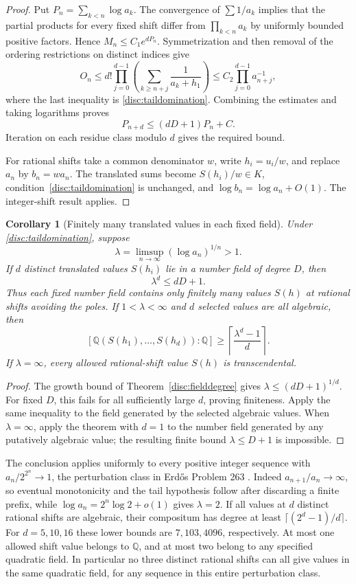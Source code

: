 \documentclass[11pt,a4paper]{article}
\newtheorem{corollary}[theorem]{Corollary}
\theoremstyle{definition}
\theoremstyle{remark}
\numberwithin{equation}{section}
\begin{document}
\begin{proof}
Put $P_n=\sum_{k<n}\log a_k$.  The convergence of $\sum1/a_k$
implies that the partial products for every fixed shift differ from
$\prod_{k<n}a_k$ by uniformly bounded positive factors.  Hence
$M_n\le C_1e^{dP_n}$.  Symmetrization and then removal of the
ordering restrictions on distinct indices give
\[
 O_n\le d!\prod_{j=0}^{d-1}
             \left(\sum_{k\ge n+j}\frac1{a_k+h_1}\right)
       \le C_2\prod_{j=0}^{d-1}a_{n+j}^{-1},
\]
where the last inequality is \eqref{disc:taildomination}.
Combining the estimates and taking logarithms proves
\[
 P_{n+d}\le(dD+1)P_n+C.
\]
Iteration on each residue class modulo $d$ gives the required bound.

For rational shifts take a common denominator $w$, write $h_i=u_i/w$,
and replace $a_n$ by $b_n=wa_n$.  The translated sums become
$S(h_i)/w\in K$, condition~\eqref{disc:taildomination} is unchanged,
and $\log b_n=\log a_n+O(1)$.  The integer-shift result applies.
\end{proof}

\begin{corollary}[Finitely many translated values in each fixed field]
\label{disc:fieldcount}
Under \eqref{disc:taildomination}, suppose
\[
 \lambda=\limsup_{n\to\infty}(\log a_n)^{1/n}>1.
\]
If $d$ distinct translated values $S(h_i)$ lie in a number field of
degree $D$, then
\[
 \lambda^d\le dD+1.
\]
Thus each fixed number field contains only finitely many values
$S(h)$ at rational shifts avoiding the poles. If $1<\lambda<\infty$
and $d$ selected values are all algebraic, then
\[
 \boxed{
 [\mathbb Q(S(h_1),\ldots,S(h_d)):\mathbb Q]
\ge\left\lceil\frac{\lambda^d-1}{d}\right\rceil.}
\]
If $\lambda=\infty$, every allowed rational-shift value $S(h)$ is
transcendental.
\end{corollary}

\begin{proof}
The growth bound of Theorem~\ref{disc:fielddegree} gives
$\lambda\le(dD+1)^{1/d}$.  For fixed $D$, this fails for all
sufficiently large $d$, proving finiteness.  Apply the same inequality
to the field generated by the selected algebraic values.
When $\lambda=\infty$, apply the theorem with $d=1$ to the number
field generated by any putatively algebraic value; the resulting
finite bound $\lambda\le D+1$ is impossible.
\end{proof}

The conclusion applies uniformly to every positive integer sequence
with $a_n/2^{2^n}\to1$, the perturbation class in Erd\H{o}s
Problem 263 \cite{Erdos263}. Indeed $a_{n+1}/a_n\to\infty$, so
eventual monotonicity and the tail hypothesis follow after discarding
a finite prefix, while $\log a_n=2^n\log2+o(1)$ gives $\lambda=2$.
If all values at $d$ distinct rational shifts are algebraic, their
compositum has degree at least $\lceil(2^d-1)/d\rceil$.
For $d=5,10,16$ these lower bounds are $7,103,4096$, respectively.
At most one allowed shift value belongs to $\mathbb Q$, and at most
two belong to any specified quadratic field. In particular no three
distinct rational shifts can all give values in the same quadratic
field, for any sequence in this entire perturbation class.
\end{document}
